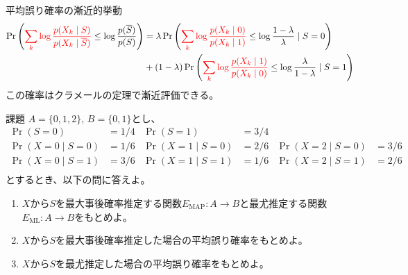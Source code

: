 \documentclass[lualatex,handout]{beamer}
\newcommand{\mycolor}[2]{%
  \begingroup
  \colorlet{currentcolor}{.}%
  \color{#1}#2%
  \color{currentcolor}%
  \endgroup
}
\newcommand{\emm}[1]{\mycolor{red}{#1}}
\theoremstyle{definition}
\begin{document}
\begin{frame}{平均誤り確率の漸近的挙動}
\footnotesize
\begin{align*}
\Pr\left(\emm{\sum_k \log\frac{p(X_k\mid S)}{p(X_k\mid \overline{S})}} \le \log\frac{p(\overline{S})}{p(S)}\right)
&=
\lambda \Pr\left(\emm{\sum_k \log\frac{p(X_k\mid 0)}{p(X_k\mid 1)}} \le \log\frac{1-\lambda}{\lambda}\mid S=0\right)\\
&+
(1-\lambda) \Pr\left(\emm{\sum_k \log\frac{p(X_k\mid 1)}{p(X_k\mid 0)}} \le \log\frac{\lambda}{1-\lambda}\mid S=1\right)
\end{align*}
この確率はクラメールの定理で漸近評価できる。


\end{frame}

\begin{frame}{課題}
\small
$A=\{0,1,2\},\,B=\{0, 1\}$とし、
\begin{align*}
\Pr(S = 0) &= 1/4&
\Pr(S = 1) &= 3/4\\
\Pr(X=0\mid S=0) &= 1/6&
\Pr(X=1\mid S=0) &= 2/6&
\Pr(X=2\mid S=0) &= 3/6\\
\Pr(X=0\mid S=1) &= 3/6&
\Pr(X=1\mid S=1) &= 1/6&
\Pr(X=2\mid S=1) &= 2/6\\
\end{align*}
とするとき、以下の問に答えよ。
\vspace{1em}
\begin{enumerate}
\setlength{\itemsep}{1em}
\item $X$から$S$を最大事後確率推定する関数$E_{\mathrm{MAP}}\colon A\to B$と最尤推定する関数$E_{\mathrm{ML}}\colon A\to B$をもとめよ。
\item $X$から$S$を最大事後確率推定した場合の平均誤り確率をもとめよ。
\item $X$から$S$を最尤推定した場合の平均誤り確率をもとめよ。
\end{enumerate}
\end{frame}
\end{document}
